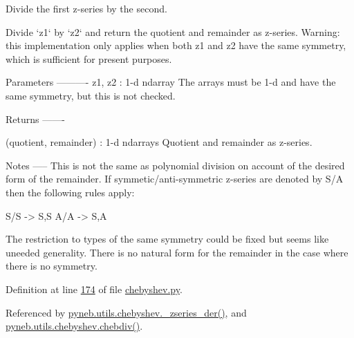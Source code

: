 \begin{DoxyVerb}Divide the first z-series by the second.

Divide `z1` by `z2` and return the quotient and remainder as z-series.
Warning: this implementation only applies when both z1 and z2 have the
same symmetry, which is sufficient for present purposes.

Parameters
----------
z1, z2 : 1-d ndarray
    The arrays must be 1-d and have the same symmetry, but this is not
    checked.

Returns
-------

(quotient, remainder) : 1-d ndarrays
    Quotient and remainder as z-series.

Notes
-----
This is not the same as polynomial division on account of the desired form
of the remainder. If symmetic/anti-symmetric z-series are denoted by S/A
then the following rules apply:

S/S -> S,S
A/A -> S,A

The restriction to types of the same symmetry could be fixed but seems like
uneeded generality. There is no natural form for the remainder in the case
where there is no symmetry.\end{DoxyVerb}
 

Definition at line \hyperlink{chebyshev_8py_source_l00174}{174} of file \hyperlink{chebyshev_8py_source}{chebyshev.\-py}.



Referenced by \hyperlink{chebyshev_8py_source_l00240}{pyneb.\-utils.\-chebyshev.\-\_\-zseries\-\_\-der()}, and \hyperlink{chebyshev_8py_source_l00725}{pyneb.\-utils.\-chebyshev.\-chebdiv()}.


